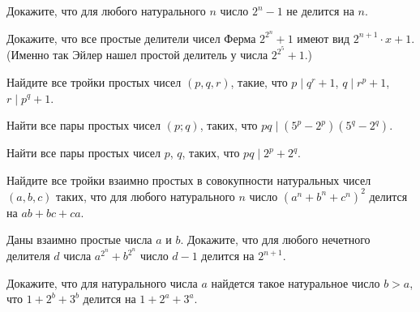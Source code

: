 Докажите, что для любого натурального $n$ число $2^n-1$ не
делится на $n$.

\newpage

\hspace{3mm}

Докажите, что все простые делители чисел Ферма $2^{2^n}+1$ имеют вид
$2^{n+1}\cdot x+1$. (Именно так Эйлер нашел простой делитель у числа
$2^{2^5}+1$.)

Найдите все тройки простых чисел $(p,q,r)$, такие, что $p \mid q^r+1$, $q \mid r^p+1$, $r \mid p^q+1$.

Найти все пары простых чисел $(p;q)$, таких, что $pq \mid (5^p-2^p)(5^q-2^q)$.

Найти все пары простых чисел $p$, $q$, таких, что $pq \mid
2^p+2^q$.

Найдите все тройки взаимно простых в совокупности натуральных чисел $(a, b, c)$ таких, что для любого натурального $n$ число $\left(a^n+b^n+c^n\right)^2$ делится на $a b+b c+c a$.

Даны взаимно простые числа $a$ и $b$. Докажите, что для любого нечетного делителя $d$ числа $a^{2^n}+b^{2^n}$ число $d-1$ делится на $2^{n+1}$.

Докажите, что для натурального числа $a$ найдется такое натуральное число $b>a$, что $1+2^b+3^b$ делится на $1+2^a+3^a$.